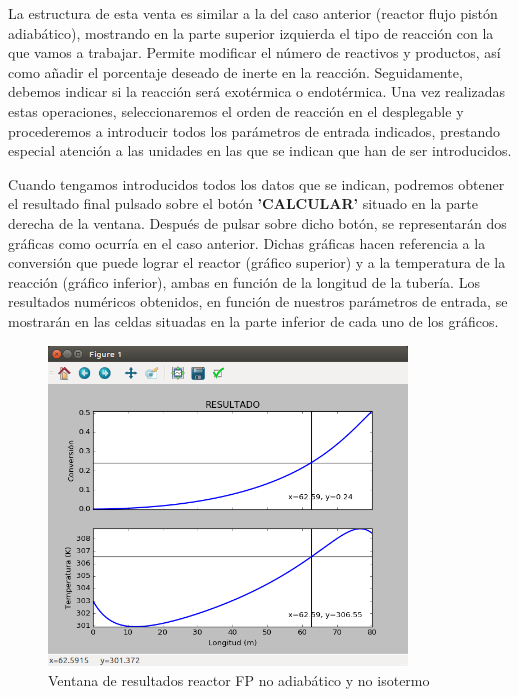 La estructura de esta venta es similar a la del caso anterior (reactor flujo pistón adiabático), mostrando en la parte superior izquierda el tipo de reacción con la que vamos a trabajar. Permite modificar el número de reactivos y productos, así como añadir el porcentaje deseado de inerte en la reacción. Seguidamente, debemos indicar si la reacción será exotérmica o endotérmica. Una vez realizadas estas operaciones, seleccionaremos el orden de reacción en el desplegable y procederemos a introducir todos los parámetros de entrada indicados, prestando especial atención a las unidades en las que se indican que han de ser introducidos.

Cuando tengamos introducidos todos los datos que se indican, podremos obtener el resultado final pulsado sobre el botón \textbf{'CALCULAR'} situado en la parte derecha de la ventana. Después de pulsar sobre dicho botón, se representarán dos gráficas como ocurría en el caso anterior. Dichas gráficas hacen referencia a la conversión que puede lograr el reactor (gráfico superior) y a la temperatura de la reacción (gráfico inferior), ambas en función de la longitud de la tubería. Los resultados numéricos obtenidos, en función de nuestros parámetros de entrada, se mostrarán en las celdas situadas en la parte inferior de cada uno de los gráficos.

\begin{figure}[h!]
	\begin{center}
		\includegraphics[width=0.85\textwidth]{./imagenes/reactor_fp/no_adi_no_iso2.png}\caption{Ventana de resultados reactor FP no adiabático y no isotermo}\label{fig:ventana_graficas_noadi_noiso}
	\end{center}
\end{figure}

